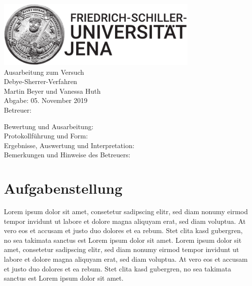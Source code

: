 \documentclass[a4paper,twoside,final]{article}
\begin{document}
\setlength{\marginparsep}{2em}
\renewcommand{\theequation}{\arabic{section}.\arabic{equation}}
\renewcommand{\thefigure}{\arabic{section}.\arabic{figure}}
\renewcommand{\thetable}{\arabic{section}.\arabic{table}}

\begin{center}
\thispagestyle{empty}
  \includegraphics[width=0.75\textwidth]{UniJena_BildWortMarke_black.pdf}\\[4em]
  \Large
  Ausarbeitung zum Versuch\\[2em]
  \Huge
  Debye-Sherrer-Verfahren\\
  \vspace{2cm}
  \Large
  Martin Beyer und Vanessa Huth\\[2em]
  Abgabe: 05. November 2019\\[2em]
  Betreuer:\\[5em]
  \begin{flushleft}
  	Bewertung und Ausarbeitung:\\[2em]
		Protokollführung und Form:\\[1em]
		Ergebnisse, Auswertung und Interpretation:\\[1em]
		Bemerkungen und Hinweise des Betreuers:
  \end{flushleft}
\end{center}
\clearpage

\pagestyle{fancy}
\renewcommand{\headrulewidth}{0pt}
\renewcommand{\footrulewidth}{0.5pt}
\renewcommand{\sectionmark}[1]{\markright{#1}}
\fancyhead[RE,LO]{\rightmark}
\fancyfoot[LE,RO]{\bfseries\thepage}
\renewcommand{\headrulewidth}{0.5pt}
\renewcommand{\footrulewidth}{0.5pt}

\setcounter{equation}{0}
\setcounter{figure}{0}


\section{Aufgabenstellung} \label{sec:Aufgabenstellung}
Lorem ipsum dolor sit amet, consetetur sadipscing elitr, sed diam nonumy eirmod tempor invidunt ut labore et dolore magna aliquyam erat, sed diam voluptua. At vero eos et accusam et justo duo dolores et ea rebum. Stet clita kasd gubergren, no sea takimata sanctus est Lorem ipsum dolor sit amet. Lorem ipsum dolor sit amet, consetetur sadipscing elitr, sed diam nonumy eirmod tempor invidunt ut labore et dolore magna aliquyam erat, sed diam voluptua. At vero eos et accusam et justo duo dolores et ea rebum. Stet clita kasd gubergren, no sea takimata sanctus est Lorem ipsum dolor sit amet.
\end{document}
